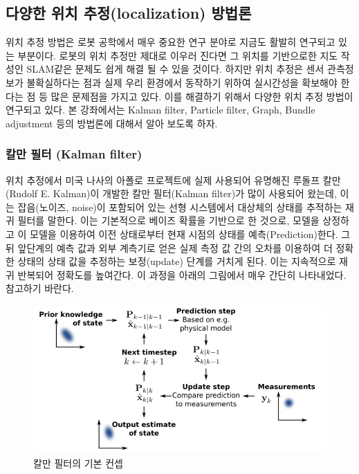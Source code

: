 \subsection{다양한 위치 추정(localization) 방법론}

위치 추정 방법은 로봇 공학에서 매우 중요한 연구 분야로 지금도 활발히 연구되고 있는 부분이다. 로봇의 위치 추정만 제대로 이우러 진다면 그 위치를 기반으로한 지도 작성인 SLAM같은 문제도 쉽게 해결 될 수 있을 것이다. 하지만 위치 추정은 센서 관측정보가 불확실하다는 점과 실제 우리 환경에서 동작하기 위하여 실시간성을 확보해야 한다는 점 등 많은 문제점을 가지고 있다. 이를 해결하기 위해서 다양한 위치 추정 방법이 연구되고 있다. 본 강좌에서는 Kalman filter, Particle filter, Graph, Bundle adjustment 등의 방법론에 대해서 알아 보도록 하자. 

\subsubsection{칼만 필터 (Kalman filter)}

위치 추정에서 미국 나사의 아폴로 프로젝트에 실제 사용되어 유명해진 루돌프 칼만(Rudolf E. Kalman)이 개발한 칼만 필터(Kalman filter)가 많이 사용되어 왔는데, 이는 잡음(노이즈, noise)이 포함되어 있는 선형 시스템에서 대상체의 상태를 추적하는 재귀 필터를 말한다. 이는 기본적으로 베이즈 확률을 기반으로 한 것으로, 모델을 상정하고 이 모델을 이용하여 이전 상태로부터 현재 시점의 상태를 예측(Prediction)한다. 그 뒤 앞단계의 예측 값과 외부 계측기로 얻은 실제 측정 값 간의 오차를 이용하여 더 정확한 상태의 상태 값을 추정하는 보정(update) 단계를 거치게 된다. 이는 지속적으로 재귀 반복되어 정확도를 높여간다. 이 과정을 아래의 그림에서 매우 간단히 나타내었다. 참고하기 바란다.

\begin{figure}[h]
\centering
\includegraphics[width=\columnwidth]{pictures/chapter11/basic_concept_of_Kalman_filtering.png}
\caption{칼만 필터의 기본 컨셉}
\end{figure}

